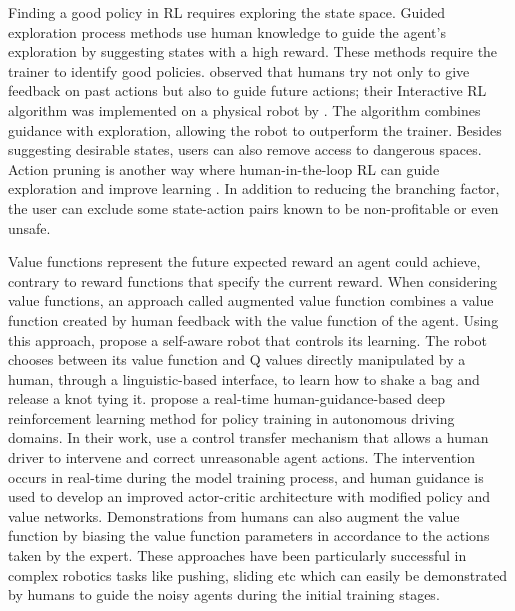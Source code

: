 \documentclass[twoside,11pt]{article}
\begin{document}
Finding a good policy in RL requires exploring the state space. Guided exploration process methods use human knowledge to guide the agent's exploration by suggesting states with a high reward. These methods require the trainer to identify good policies. \cite{Thomaz:2006:RLWithHumanTeachers} observed that humans try not only to give feedback on past actions but also to guide future actions; their Interactive RL algorithm was implemented on a physical robot by \cite{suay:11}. The algorithm combines guidance with exploration, allowing the robot to outperform the trainer. Besides suggesting desirable states, users can also remove access to dangerous spaces. Action pruning is another way where human-in-the-loop RL can guide exploration and improve learning \citep{Abel:2017:AgentAgnosticHumanInTheLoopRL}. In addition to reducing the branching factor, the user can exclude some state-action pairs known to be non-profitable or even unsafe.


Value functions represent the future expected reward an agent could achieve, contrary to reward functions that specify the current reward. When considering value functions, an approach called augmented value function combines a value function created by human feedback with the value function of the agent. Using this approach, \cite{kartoun:10} propose a self-aware robot that controls its learning. The robot chooses between its value function and Q values directly manipulated by a human, through a linguistic-based interface, to learn how to shake a bag and release a knot tying it. \cite{jiang:21} propose a real-time human-guidance-based deep reinforcement learning method for policy training in autonomous driving domains. In their work, \cite{wu:21} use a control transfer mechanism that allows a human driver to intervene and correct unreasonable agent actions. The intervention occurs in real-time during the model training process, and human guidance is used to develop an improved actor-critic architecture with modified policy and value networks. Demonstrations \citep{hester2018deep,vecerik2017leveraging,nair2018overcoming} from humans can also augment the value function by biasing the value function parameters in accordance to the  actions taken by the expert. These approaches have been particularly successful in complex robotics tasks like pushing, sliding etc which can easily be demonstrated by humans to guide the noisy agents during the initial training stages.  
\end{document}
